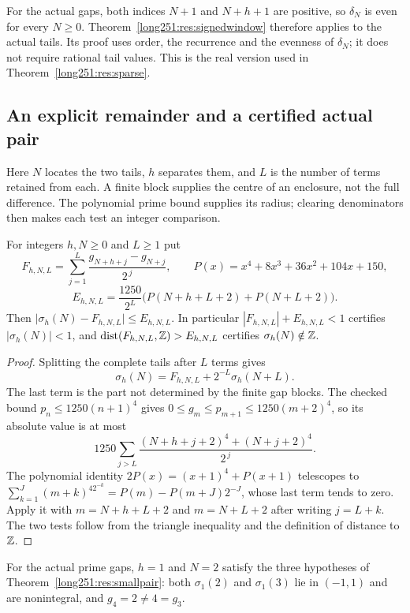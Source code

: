 \documentclass[11pt]{article}
\begin{document}
For the actual gaps, both indices $N+1$ and $N+h+1$ are positive, so
$\delta_N$ is even for every $N\ge0$.
Theorem~\ref{long251:res:signedwindow} therefore applies to the actual
tails.  Its proof uses order, the recurrence and the evenness of
$\delta_N$; it does not require rational tail values.  This is the real
version used in Theorem~\ref{long251:res:sparse}.

\subsection{An explicit remainder and a certified actual pair}

Here $N$ locates the two tails, $h$ separates them, and $L$ is the
number of terms retained from each.  A finite block supplies the centre
of an enclosure, not the full difference.  The polynomial prime bound
supplies its radius; clearing denominators then makes each test an
integer comparison.

\begin{proposition}\label{long251:res:explicit-remainder}
For integers $h,N\ge0$ and $L\ge1$ put
\[
 F_{h,N,L}=\sum_{j=1}^{L}\frac{g_{N+h+j}-g_{N+j}}{2^{\,j}},\qquad
 P(x)=x^4+8x^3+36x^2+104x+150,
\]
\[
 E_{h,N,L}=\frac{1250}{2^{L}}\bigl(P(N+h+L+2)+P(N+L+2)\bigr).
\]
Then $\bigl|\sigma_h(N)-F_{h,N,L}\bigr|\le E_{h,N,L}$.  In particular
$|F_{h,N,L}|+E_{h,N,L}<1$ certifies $|\sigma_h(N)|<1$, and
$\operatorname{dist}(F_{h,N,L},\mathbb{Z})>E_{h,N,L}$ certifies
$\sigma_h(N)\notin\mathbb{Z}$.
\end{proposition}

\begin{proof}
Splitting the complete tails after $L$ terms gives
\[
 \sigma_h(N)=F_{h,N,L}+2^{-L}\sigma_h(N+L).
\]
The last term is the part not determined by the finite gap blocks.
The checked bound $p_n\le1250(n+1)^4$ gives $0\le g_m\le p_{m+1}\le1250(m+2)^4$,
so its absolute value is at most
\[
 1250\sum_{j>L}\frac{(N+h+j+2)^4+(N+j+2)^4}{2^{\,j}} .
\]
The polynomial identity $2P(x)=(x+1)^4+P(x+1)$ telescopes to
$\sum_{k=1}^{J}(m+k)^42^{-k}=P(m)-P(m+J)2^{-J}$, whose last term tends to zero.
Apply it with $m=N+h+L+2$ and $m=N+L+2$ after writing $j=L+k$.  The two tests
follow from the triangle inequality and the definition of distance to $\mathbb{Z}$.
\end{proof}

\begin{proposition}\label{long251:res:finite-smallpair}
For the actual prime gaps, $h=1$ and $N=2$ satisfy the three hypotheses of
Theorem~\ref{long251:res:smallpair}: both $\sigma_1(2)$ and $\sigma_1(3)$ lie in
$(-1,1)$ and are nonintegral, and $g_4=2\ne4=g_3$.
\end{proposition}
\end{document}
